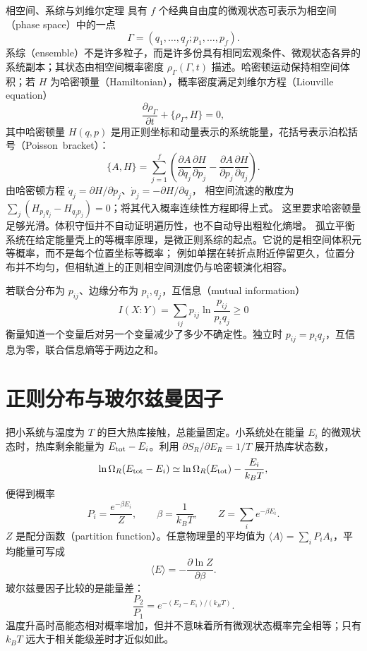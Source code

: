\begin{starread}{相空间、系综与刘维尔定理}
具有 $f$ 个经典自由度的微观状态可表示为相空间（phase space）中的一点
\[
 \Gamma=(q_1,\ldots,q_f;p_1,\ldots,p_f).
\]
系综（ensemble）不是许多粒子，而是许多份具有相同宏观条件、微观状态各异的系统副本；其状态由相空间概率密度
$\rho_\Gamma(\Gamma,t)$ 描述。哈密顿运动保持相空间体积；若 $H$ 为哈密顿量（Hamiltonian），概率密度满足刘维尔方程（Liouville equation）
\[
 \frac{\partial\rho_\Gamma}{\partial t}+\{\rho_\Gamma,H\}=0,
\]
其中哈密顿量 $H(q,p)$ 是用正则坐标和动量表示的系统能量，花括号表示泊松括号（\mbox{Poisson bracket}）：
\[\{A,H\}=\sum_{j=1}^{f}\left(\frac{\partial A}{\partial q_j}\frac{\partial H}{\partial p_j}
-\frac{\partial A}{\partial p_j}\frac{\partial H}{\partial q_j}\right).\]
由哈密顿方程 $\dot q_j=\partial H/\partial p_j$、$\dot p_j=-\partial H/\partial q_j$，
相空间流速的散度为 $\sum_j(H_{p_jq_j}-H_{q_jp_j})=0$；将其代入概率连续性方程即得上式。
这里要求哈密顿量足够光滑。体积守恒并不自动证明遍历性，也不自动导出粗粒化熵增。
孤立平衡系统在给定能量壳上的等概率原理，是微正则系综的起点。它说的是相空间体积元等概率，而不是每个位置坐标等概率；
例如单摆在转折点附近停留更久，位置分布并不均匀，但相轨道上的正则相空间测度仍与哈密顿演化相容。

若联合分布为 $p_{ij}$、边缘分布为 $p_i,q_j$，互信息（mutual information）
\[
 I(X{:}Y)=\sum_{ij}p_{ij}\ln\frac{p_{ij}}{p_iq_j}\ge0
\]
衡量知道一个变量后对另一个变量减少了多少不确定性。独立时 $p_{ij}=p_iq_j$，互信息为零，联合信息熵等于两边之和。
\end{starread}

\section{正则分布与玻尔兹曼因子}

把小系统与温度为 $T$ 的巨大热库接触，总能量固定。小系统处在能量 $E_i$ 的微观状态时，热库剩余能量为
$E_{\rm tot}-E_i$。利用 $\partial S_R/\partial E_R=1/T$ 展开热库状态数，
\[
 \ln\Omega_R(E_{\rm tot}-E_i)
 \simeq\ln\Omega_R(E_{\rm tot})-\frac{E_i}{k_BT},
\]
便得到概率
\begin{equation}
 P_i=\frac{e^{-\beta E_i}}{Z},\qquad
 \beta=\frac1{k_BT},\qquad
 Z=\sum_i e^{-\beta E_i}.
\end{equation}
$Z$ 是配分函数（partition function）。任意物理量的平均值为 $\langle A\rangle=\sum_iP_iA_i$，平均能量可写成
\begin{equation}
 \langle E\rangle=-\frac{\partial\ln Z}{\partial\beta}.
\end{equation}
玻尔兹曼因子比较的是能量差：
\begin{equation}
 \frac{P_2}{P_1}=e^{-(E_2-E_1)/(k_BT)}.
\end{equation}
温度升高时高能态相对概率增加，但并不意味着所有微观状态概率完全相等；只有 $k_BT$ 远大于相关能级差时才近似如此。

